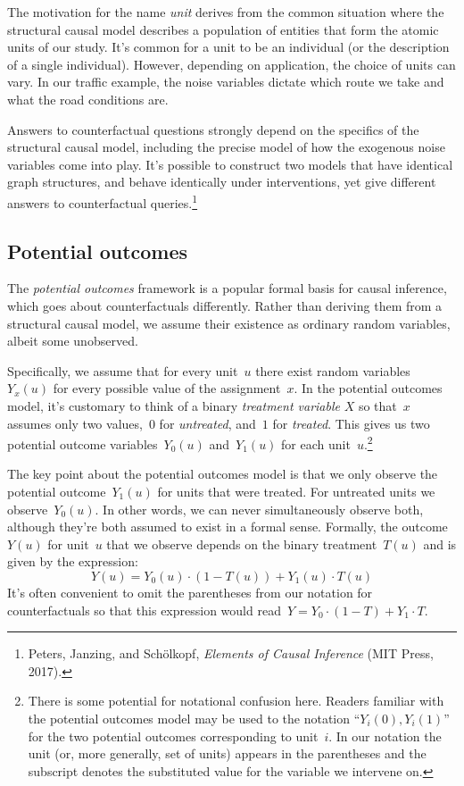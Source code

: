 \documentclass{tufte-book}
\begin{document}
The motivation for the name \emph{unit} derives from the common
situation where the structural causal model describes a population of
entities that form the atomic units of our study. It's common for a unit
to be an individual (or the description of a single individual).
However, depending on application, the choice of units can vary. In our
traffic example, the noise variables dictate which route we take and
what the road conditions are.

Answers to counterfactual questions strongly depend on the specifics of
the structural causal model, including the precise model of how the
exogenous noise variables come into play. It's possible to construct two
models that have identical graph structures, and behave identically
under interventions, yet give different answers to counterfactual
queries.\footnote{Peters, Janzing, and Schölkopf, \emph{Elements of
  Causal Inference} (MIT Press, 2017).}

\hypertarget{potential-outcomes}{%
\subsection{Potential outcomes}\label{potential-outcomes}}

The \emph{potential outcomes} framework is a
popular formal basis for causal inference, which goes about
counterfactuals differently. Rather than deriving them from a structural
causal model, we assume their existence as ordinary random variables,
albeit some unobserved.

Specifically, we assume that for every unit~\(u\) there exist random
variables~\(Y_x(u)\) for every possible value of the assignment~\(x\).
In the potential outcomes model, it's customary to think of a binary
\emph{treatment variable} \(X\) so that~\(x\) assumes only two
values,~\(0\) for \emph{untreated}, and~\(1\) for \emph{treated}. This
gives us two potential outcome variables~\(Y_0(u)\) and~\(Y_1(u)\) for
each unit~\(u\).\footnote{There is some potential for notational
  confusion here. Readers familiar with the potential outcomes model may
  be used to the notation ``\(Y_i(0), Y_i(1)\)'' for the two potential
  outcomes corresponding to unit~\(i\). In our notation the unit (or,
  more generally, set of units) appears in the parentheses and the
  subscript denotes the substituted value for the variable we intervene
  on.}

The key point about the potential outcomes model is that we only observe
the potential outcome~\(Y_1(u)\) for units that were treated. For
untreated units we observe~\(Y_0(u)\). In other words, we can never
simultaneously observe both, although they're both assumed to exist in a
formal sense. Formally, the outcome~\(Y(u)\) for unit~\(u\) that we
observe depends on the binary treatment~\(T(u)\) and is given by the
expression: \[Y(u)=Y_0(u)\cdot(1-T(u))+Y_1(u) \cdot T(u)\] It's often
convenient to omit the parentheses from our notation for counterfactuals
so that this expression would read~\(Y=Y_0\cdot(1-T)+Y_1\cdot T\).
\end{document}
